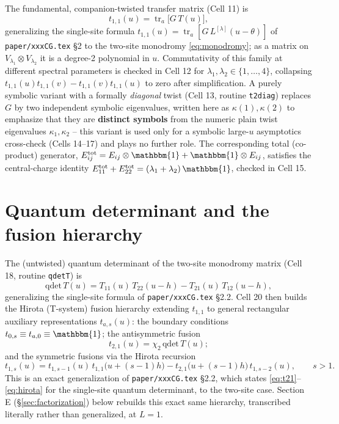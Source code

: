 \documentclass[11pt]{article}
\begin{document}
The fundamental, companion-twisted transfer matrix (Cell 11) is
\begin{equation}
  t_{1,1}(u) = \operatorname{tr}_a\!\bigl[G\,T(u)\bigr],
  \label{eq:t11}
\end{equation}
generalizing the single-site formula $t_{1,1}(u)=\operatorname{tr}_a[G\,L^{[\lambda]}(u-\theta)]$ of
\texttt{paper/xxxCG.tex} \S2 to the two-site monodromy \eqref{eq:monodromy}; as a matrix on
$V_{\lambda_1}\otimes V_{\lambda_2}$ it is a degree-2 polynomial in $u$. Commutativity of this
family at different spectral parameters is checked in Cell 12 for $\lambda_1,\lambda_2\in\{1,\dots,4\}$,
collapsing $t_{1,1}(u)t_{1,1}(v)-t_{1,1}(v)t_{1,1}(u)$ to zero after simplification. A purely
symbolic variant with a formally \emph{diagonal} twist (Cell 13, routine \texttt{t2diag}) replaces
$G$ by two independent symbolic eigenvalues, written here as $\kappa(1),\kappa(2)$ to emphasize that
they are \textbf{distinct symbols} from the numeric plain twist eigenvalues $\kappa_1,\kappa_2$ --
this variant is used only for a symbolic large-$u$ asymptotics cross-check (Cells 14--17) and plays
no further role. The corresponding total (co-product) generator, $E_{ij}^{\mathrm{tot}} =
E_{ij}\otimes\mathbbm{1} + \mathbbm{1}\otimes E_{ij}$, satisfies the central-charge identity
$E_{11}^{\mathrm{tot}}+E_{22}^{\mathrm{tot}}=(\lambda_1+\lambda_2)\,\mathbbm{1}$, checked in Cell 15.

\section{Quantum determinant and the fusion hierarchy}
\label{sec:fusion}

The (untwisted) quantum determinant of the two-site monodromy matrix (Cell 18, routine
\texttt{qdetT}) is
\begin{equation}
  \mathrm{qdet}\,T(u) = T_{11}(u)\,T_{22}(u-h) - T_{21}(u)\,T_{12}(u-h),
  \label{eq:qdet}
\end{equation}
generalizing the single-site formula of \texttt{paper/xxxCG.tex} \S2.2. Cell 20 then builds the
Hirota (T-system) fusion hierarchy extending $t_{1,1}$ to general rectangular auxiliary
representations $t_{a,s}(u)$: the boundary conditions $t_{0,s}\equiv t_{a,0}\equiv\mathbbm{1}$; the
antisymmetric fusion
\begin{equation}
  t_{2,1}(u) = \chi_2\,\mathrm{qdet}\,T(u);
  \label{eq:t21}
\end{equation}
and the symmetric fusions via the Hirota recursion
\begin{equation}
  t_{1,s}(u) = t_{1,s-1}(u)\,t_{1,1}\bigl(u+(s-1)h\bigr) - t_{2,1}\bigl(u+(s-1)h\bigr)\,t_{1,s-2}(u),
  \qquad s>1.
  \label{eq:hirota}
\end{equation}
This is an exact generalization of \texttt{paper/xxxCG.tex} \S2.2, which states
\eqref{eq:t21}--\eqref{eq:hirota} for the single-site quantum determinant, to the two-site case.
Section E (\S\ref{sec:factorization}) below rebuilds this exact same hierarchy, transcribed
literally rather than generalized, at $L=1$.
\end{document}
